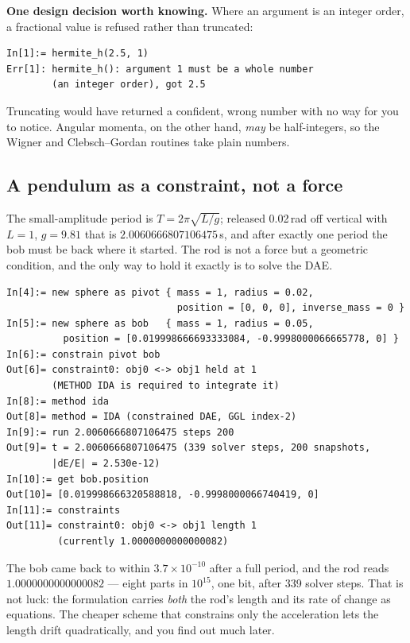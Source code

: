 \documentclass[11pt]{article}
\begin{document}
\textbf{One design decision worth knowing.} Where an argument is an
integer order, a fractional value is refused rather than truncated:

\begin{lstlisting}
In[1]:= hermite_h(2.5, 1)
Err[1]: hermite_h(): argument 1 must be a whole number
        (an integer order), got 2.5
\end{lstlisting}

Truncating would have returned a confident, wrong number with no way for
you to notice. Angular momenta, on the other hand, \emph{may} be
half-integers, so the Wigner and Clebsch--Gordan routines take plain
numbers.

\subsection{A pendulum as a constraint, not a force}

The small-amplitude period is $T = 2\pi\sqrt{L/g}$; released 0.02\,rad
off vertical with $L=1$, $g=9.81$ that is $2.0060666807106475$\,s, and
after exactly one period the bob must be back where it started. The rod
is not a force but a geometric condition, and the only way to hold it
exactly is to solve the DAE.

\begin{lstlisting}
In[4]:= new sphere as pivot { mass = 1, radius = 0.02,
                              position = [0, 0, 0], inverse_mass = 0 }
In[5]:= new sphere as bob   { mass = 1, radius = 0.05,
          position = [0.019998666693333084, -0.9998000066665778, 0] }
In[6]:= constrain pivot bob
Out[6]= constraint0: obj0 <-> obj1 held at 1
        (METHOD IDA is required to integrate it)
In[8]:= method ida
Out[8]= method = IDA (constrained DAE, GGL index-2)
In[9]:= run 2.0060666807106475 steps 200
Out[9]= t = 2.0060666807106475 (339 solver steps, 200 snapshots,
        |dE/E| = 2.530e-12)
In[10]:= get bob.position
Out[10]= [0.019998666320588818, -0.9998000066740419, 0]
In[11]:= constraints
Out[11]= constraint0: obj0 <-> obj1 length 1
         (currently 1.0000000000000082)
\end{lstlisting}

The bob came back to within $3.7\times10^{-10}$ after a full period, and
the rod reads $1.0000000000000082$ --- eight parts in $10^{15}$, one
bit, after 339 solver steps. That is not luck: the formulation carries
\emph{both} the rod's length and its rate of change as equations. The
cheaper scheme that constrains only the acceleration lets the length
drift quadratically, and you find out much later.
\end{document}
